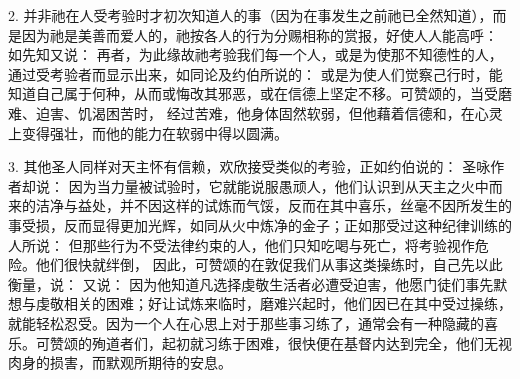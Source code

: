2. 并非祂在人受考验时才初次知道人的事（因为在事发生之前祂已全然知道），而是因为祂是美善而爱人的，祂按各人的行为分赐相称的赏报，好使人人能高呼： 如先知又说： 再者，为此缘故祂考验我们每一个人，或是为使那不知德性的人，通过受考验者而显示出来，如同论及约伯所说的： 或是为使人们觉察己行时，能知道自己属于何种，从而或悔改其邪恶，或在信德上坚定不移。可赞颂的，当受磨难、迫害、饥渴困苦时，  经过苦难，他身体固然软弱，但他藉着信德和，在心灵上变得强壮，而他的能力在软弱中得以圆满。\par

3. 其他圣人同样对天主怀有信赖，欢欣接受类似的考验，正如约伯说的：  圣咏作者却说： 因为当力量被试验时，它就能说服愚顽人，他们认识到从天主之火中而来的洁净与益处，并不因这样的试炼而气馁，反而在其中喜乐，丝毫不因所发生的事受损，反而显得更加光辉，如同从火中炼净的金子；正如那受过这种纪律训练的人所说： 但那些行为不受法律约束的人，他们只知吃喝与死亡，将考验视作危险。他们很快就绊倒，  因此，可赞颂的在敦促我们从事这类操练时，自己先以此衡量，说： 又说： 因为他知道凡选择虔敬生活者必遭受迫害，他愿门徒们事先默想与虔敬相关的困难；好让试炼来临时，磨难兴起时，他们因已在其中受过操练，就能轻松忍受。因为一个人在心思上对于那些事习练了，通常会有一种隐藏的喜乐。可赞颂的殉道者们，起初就习练于困难，很快便在基督内达到完全，他们无视肉身的损害，而默观所期待的安息。\par

